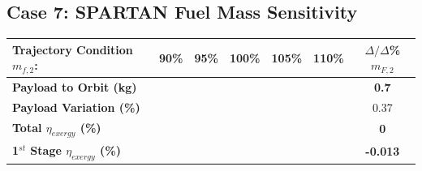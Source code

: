 \subsection{Case 7: SPARTAN Fuel Mass Sensitivity} \label{sec:fuelmassNoReturn}

\begin{table}[!ht]
\begin{tabular}{l c c c c c c} 
	\hline \textbf{Trajectory Condition}   \qquad  $m_{f,2}$:
	&90\%
	&95\%
	&100\%
	&105\%
	&110\%
	& $\Delta/\Delta$\%$m_{F,2}$
	\\
	\hline \textbf{Payload to Orbit (kg)}
	& \textbf{\PayloadToOrbitmFuelNinetyNoReturn}
	& \textbf{\PayloadToOrbitmFuelNinetyFiveNoReturn}
	& \textbf{\PayloadToOrbitmFuelStandardNoReturn}
	& \textbf{\PayloadToOrbitmFuelOneHundredFiveNoReturn}
	& \textbf{\PayloadToOrbitmFuelOneHundredTenNoReturn}
	&\textbf{0.7}
	\\
	\textbf{Payload Variation (\%)}
	& \PayloadVarmFuelNinetyNoReturn
	& \PayloadVarmFuelNinetyFiveNoReturn
	& \PayloadVarmFuelStandardNoReturn
	& \PayloadVarmFuelOneHundredFiveNoReturn
	& \PayloadVarmFuelOneHundredTenNoReturn
	&0.37
	\\
	\textbf{Total $\eta_{exergy}$ (\%)}
	& \textbf{\totalExergyEffmFuelNinetyNoReturn}
	& \textbf{\totalExergyEffmFuelNinetyFiveNoReturn}
	& \textbf{\totalExergyEffmFuelStandardNoReturn}
	& \textbf{\totalExergyEffmFuelOneHundredFiveNoReturn}
	& \textbf{\totalExergyEffmFuelOneHundredTenNoReturn}
	& \textbf{0}
	\\
	\hline 
	\textbf{1$^{st}$ Stage $\eta_{exergy}$ (\%)}
	& \textbf{\firstExergyEffmFuelNinetyNoReturn}
	& \textbf{\firstExergyEffmFuelNinetyFiveNoReturn}
	& \textbf{\firstExergyEffmFuelStandardNoReturn}
	& \textbf{\firstExergyEffmFuelOneHundredFiveNoReturn}
	& \textbf{\firstExergyEffmFuelOneHundredTenNoReturn}
	& \textbf{-0.013}
	\\


\end{tabular}
\end{table}
